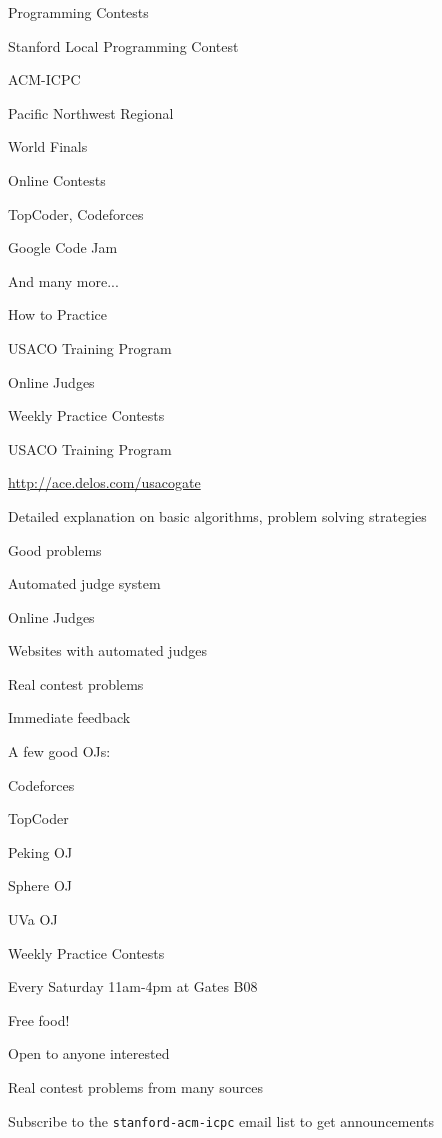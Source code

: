 \documentclass[13pt,onlymath]{beamer}
\begin{document}
\begin{frame}{Programming Contests}
\BIT
\item Stanford Local Programming Contest
\item ACM-ICPC
\BIT
\item Pacific Northwest Regional
\item World Finals
\EIT
\item Online Contests
\BIT
\item TopCoder, Codeforces
\item Google Code Jam
\EIT
\item And many more...
\EIT
\end{frame}

\begin{frame} {How to Practice}
\BIT
\item USACO Training Program
\item Online Judges
\item Weekly Practice Contests
\EIT
\end{frame}

\begin{frame} {USACO Training Program}
\BIT
\item \url{http://ace.delos.com/usacogate}
\item Detailed explanation on basic algorithms, problem solving strategies
\item Good problems
\item Automated judge system
\EIT
\end{frame}

\begin{frame} {Online Judges}
\BIT
\item Websites with automated judges
\BIT
\item Real contest problems
\item Immediate feedback
\EIT
\item A few good OJs:
\BIT
\item Codeforces
\item TopCoder
\item Peking OJ
\item Sphere OJ
\item UVa OJ
\EIT
\EIT
\end{frame}

\begin{frame} {Weekly Practice Contests}
\BIT
\item Every Saturday 11am-4pm at Gates B08
\BIT
\item Free food!
\EIT
\item Open to anyone interested
\item Real contest problems from many sources
\item Subscribe to the \texttt{stanford-acm-icpc} email list to get announcements
\EIT
\end{frame}
\end{document}
